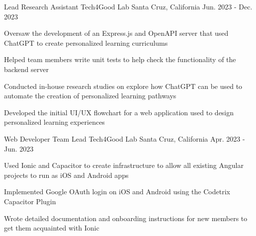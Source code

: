 

\begin{cventries}

  \cventry
    {Lead Research Assistant} %
    {Tech4Good Lab} %
    {Santa Cruz, California} %
    {Jun. 2023 - Dec. 2023} %
    {
      \begin{cvitems} %
        \item{Oversaw the development of an Express.js and OpenAPI server that used ChatGPT to create
              personalized learning curriculums}
        \item{Helped team members write unit tests to help check the functionality of the backend server}
        \item{Conducted in-house research studies on explore how ChatGPT can be used to automate the
              creation of personalized learning pathways}
        \item{Developed the initial UI/UX flowchart for a web application used to design personalized
        learning experiences}
      \end{cvitems}
    }

  \cventry
    {Web Developer Team Lead} %
    {Tech4Good Lab} %
    {Santa Cruz, California} %
    {Apr. 2023 - Jun. 2023} %
    {
      \begin{cvitems} %
        \item{Used Ionic and Capacitor to create infrastructure to allow all existing Angular projects to run as
              iOS and Android apps}
        \item{Implemented Google OAuth login on iOS and Android using the Codetrix Capacitor Plugin}
        \item{Wrote detailed documentation and onboarding instructions for new members to get them
              acquainted with Ionic}
      \end{cvitems}
  }
\end{cventries}
